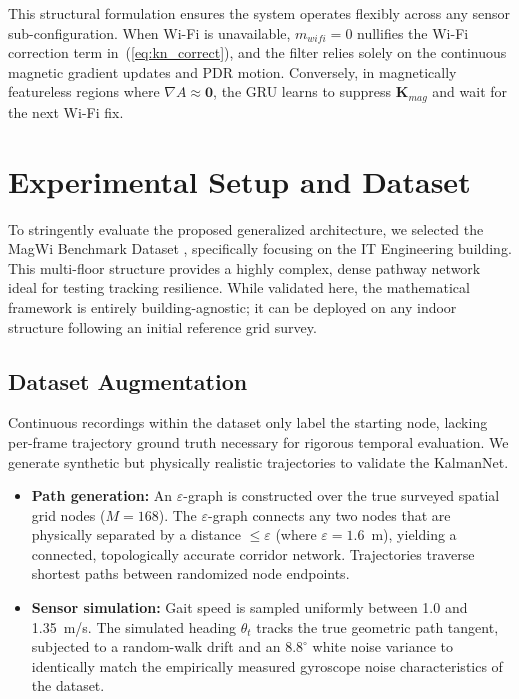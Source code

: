 \documentclass[conference]{IEEEtran}
\begin{document}
This structural formulation ensures the system operates flexibly across any sensor sub-configuration. When Wi-Fi is unavailable, $m_{wifi} = 0$ nullifies the Wi-Fi correction term in~(\ref{eq:kn_correct}), and the filter relies solely on the continuous magnetic gradient updates and PDR motion. Conversely, in magnetically featureless regions where $\nabla A \approx \mathbf{0}$, the GRU learns to suppress $\mathbf{K}_{mag}$ and wait for the next Wi-Fi fix.

\section{Experimental Setup and Dataset}\label{sec:setup}

To stringently evaluate the proposed generalized architecture, we selected the MagWi Benchmark Dataset \cite{magwi}, specifically focusing on the IT Engineering building. This multi-floor structure provides a highly complex, dense pathway network ideal for testing tracking resilience. While validated here, the mathematical framework is entirely building-agnostic; it can be deployed on any indoor structure following an initial reference grid survey.

\subsection{Dataset Augmentation}

Continuous recordings within the dataset only label the starting node, lacking per-frame trajectory ground truth necessary for rigorous temporal evaluation. We generate synthetic but physically realistic trajectories to validate the KalmanNet.

\begin{itemize}
    \item \textbf{Path generation:} An $\varepsilon$-graph is constructed over the true surveyed spatial grid nodes ($M=168$). The $\varepsilon$-graph connects any two nodes that are physically separated by a distance $\leq \varepsilon$ (where $\varepsilon = 1.6$~m), yielding a connected, topologically accurate corridor network. Trajectories traverse shortest paths between randomized node endpoints.
    \item \textbf{Sensor simulation:} Gait speed is sampled uniformly between 1.0 and 1.35~m/s. The simulated heading $\theta_t$ tracks the true geometric path tangent, subjected to a random-walk drift and an $8.8^{\circ}$ white noise variance to identically match the empirically measured gyroscope noise characteristics of the dataset.
\end{itemize}
\end{document}
